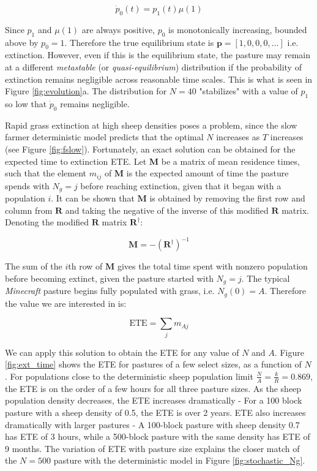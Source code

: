 \documentclass{article}
\theoremstyle{theorem}
\theoremstyle{definition}
\begin{document}
$$\dot{p}_0(t)=p_1(t)\mu(1)$$

Since $p_1$ and $\mu(1)$ are always positive, $p_0$ is monotonically increasing, bounded above by $p_0=1$. Therefore the true equilibrium state is $\mathbf{p}=[1, 0, 0, 0, \dots]$ i.e. extinction. However, even if this is the equilibrium state, the pasture may remain at a different \textit{metastable} (or \textit{quasi-equilibrium}) distribution if the probability of extinction remains negligible across reasonable time scales. This is what is seen in Figure \ref{fig:evolution}a. The distribution for $N=40$ "stabilizes" with a value of $p_1$ so low that $\dot{p}_0$ remains negligible.

Rapid grass extinction at high sheep densities poses a problem, since the slow farmer deterministic model predicts that the optimal $N$ increases as $T$ increases (see Figure \ref{fig:fslow}). Fortunately, an exact solution can be obtained for the expected time to extinction ETE. Let $\mathbf{M}$ be a matrix of mean residence times, such that the element $m_{ij}$ of $\mathbf{M}$ is the expected amount of time the pasture spends with $N_g=j$ before reaching extinction, given that it began with a population $i$. It can be shown \cite{matis_wehrly_metzler} that $\mathbf{M}$ is obtained by removing the first row and column from $\mathbf{R}$ and taking the negative of the inverse of this modified $\mathbf{R}$ matrix. Denoting the modified $\mathbf{R}$ matrix $\mathbf{R}^\dagger$:

$$\mathbf{M}=-(\mathbf{R}^\dagger)^{-1}$$

The sum of the $i$th row of $\mathbf{M}$ gives the total time spent with nonzero population before becoming extinct, given the pasture started with $N_g=j$. The typical \textit{Minecraft} pasture begins fully populated with grass, i.e. $N_g(0)=A$. Therefore the value we are interested in is:

$$\mathrm{ETE}=\sum_{j}m_{Aj}$$

We can apply this solution to obtain the ETE for any value of $N$ and $A$. Figure \ref{fig:ext_time} shows the ETE for pastures of a few select sizes, as a function of $N$. For populations close to the deterministic sheep population limit $\frac{N}{A}=\frac{k}{R}=0.869$, the ETE is on the order of a few hours for all three pasture sizes. As the sheep population density decreases, the ETE increases dramatically - For a 100 block pasture with a sheep density of 0.5, the ETE is over 2 years. ETE also increases dramatically with larger pastures - A 100-block pasture with sheep density 0.7 has ETE of 3 hours, while a 500-block pasture with the same density has ETE of 9 months. The variation of ETE with pasture size explains the closer match of the $N=500$ pasture with the deterministic model in Figure \ref{fig:stochastic_Ng}.
\end{document}
